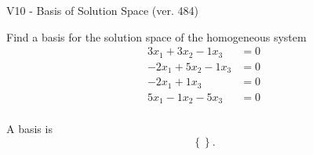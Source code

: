 \begin{exercise}
  \begin{exerciseTitle}V10 - Basis of Solution Space (ver. 484)\end{exerciseTitle}
  \begin{exerciseStatement}
    Find a basis for the solution space of the homogeneous system 
\begin{align*}
 3 x_ 1 + 3 x_ 2 -1 x_ 3 &= 0  \\ 
  -2 x_ 1 + 5 x_ 2 -1 x_ 3 &= 0  \\ 
  -2 x_ 1 + 1 x_ 3 &= 0  \\ 
  5 x_ 1 -1 x_ 2 -5 x_ 3 &= 0  \\ 
 \end{align*}


 
  \end{exerciseStatement}

  \begin{exerciseAnswer}
   A basis is   
\[\left\{\right\}.\]

  


  \end{exerciseAnswer}
\end{exercise}